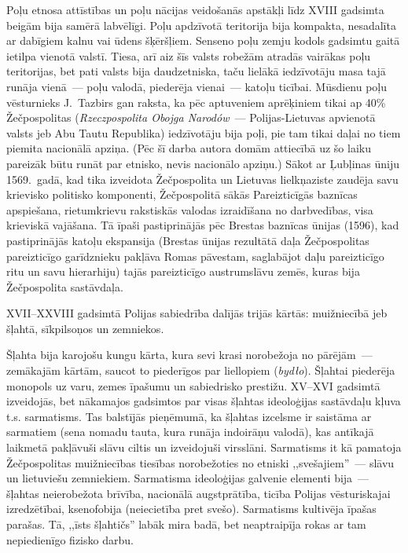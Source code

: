 \documentclass[twoside,a5paper,12pt,fleqn,openany]{extbook}
\newcommand{\pltxti}[1]{\textit{\textpolish{#1}}}
\begin{document}
Poļu etnosa attīstības un poļu nācijas veidošanās apstākļi līdz XVIII gadsimta beigām bija samērā labvēlīgi. Poļu apdzīvotā teritorija bija kompakta, nesadalīta ar dabīgiem kalnu vai ūdens šķēršļiem. Senseno poļu zemju kodols gadsimtu gaitā ietilpa vienotā valstī. Tiesa, arī aiz šīs valsts robežām atradās vairākas poļu teritorijas, bet pati valsts bija daudzetniska, taču lielākā iedzīvotāju masa tajā runāja vienā~--- poļu valodā, piederēja vienai~--- katoļu ticībai. Mūsdienu poļu vēsturnieks J.~Tazbirs gan raksta, ka pēc aptuveniem aprēķiniem tikai ap 40\% Žečpospolitas (\pltxti{Rzeczpospolita Obojga Narodów}~--- Polijas-Lietuvas apvienotā valsts jeb Abu Tautu Republika) iedzīvotāju bija poļi, pie tam tikai daļai no tiem piemita nacionālā apziņa. (Pēc šī darba autora domām attiecībā uz šo laiku pareizāk būtu runāt par etnisko, nevis nacionālo apziņu.) Sākot ar Ļubļinas ūniju 1569.~gadā, kad tika izveidota Žečpospolita un Lietuvas lielkņaziste zaudēja savu krievisko politisko komponenti, Žečpospolitā sākās Pareizticīgās baznīcas apspiešana, rietumkrievu rakstiskās valodas izraidīšana no darbvedības, visa krieviskā vajāšana. Tā īpaši pastiprinājās pēc Brestas baznīcas ūnijas (1596), kad pastiprinājās katoļu ekspansija (Brestas ūnijas rezultātā daļa Žečpospolitas pareizticīgo garīdznieku pakļāva Romas pāvestam, saglabājot daļu pareizticīgo ritu un savu hierarhiju) tajās pareizticīgo austrumslāvu zemēs, kuras bija Žečpospolita sastāvdaļa.

XVII--XXVIII gadsimtā Polijas sabiedrība dalījās trijās kārtās: muižniecībā jeb šļahtā, sīkpilsoņos un zemniekos.

Šļahta bija karojošu kungu kārta, kura sevi krasi norobežoja no pārējām~--- zemākajām kārtām, saucot to piederīgos par liellopiem (\pltxti{bydło}). Šļahtai piederēja monopols uz varu, zemes īpašumu un sabiedrisko prestižu. XV--XVI gadsimtā izveidojās, bet nākamajos gadsimtos par visas šļahtas ideoloģijas sastāvdaļu kļuva t.s. sarmatisms. Tas balstījās pieņēmumā, ka šļahtas izcelsme ir saistāma ar sarmatiem (sena nomadu tauta, kura runāja indoirāņu valodā), kas antīkajā laikmetā pakļāvuši slāvu ciltis un izveidojuši virsslāni. Sarmatisms it kā pamatoja Žečpospolitas muižniecības tiesības norobežoties no etniski ,,svešajiem''~--- slāvu un lietuviešu zemniekiem. Sarmatisma ideoloģijas galvenie elementi bija~--- šļahtas neierobežota brīvība, nacionālā augstprātība, ticība Polijas vēsturiskajai izredzētībai, ksenofobija (neiecietība pret svešo). Sarmatisms kultivēja īpašas parašas. Tā, ,,īsts šļahtičs'' labāk mira badā, bet neaptraipīja rokas ar tam nepiedienīgo fizisko darbu.
\end{document}
